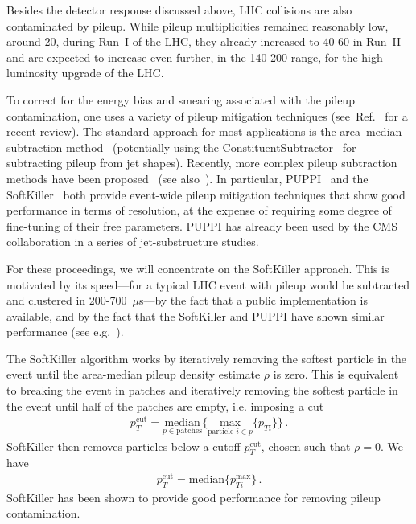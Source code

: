 Besides the detector response discussed above, LHC collisions are also
contaminated by pileup.
%
While pileup multiplicities remained reasonably low, around 20, during Run~I of
the LHC, they already increased to 40-60 in Run~II and are expected to
increase even further, in the 140-200 range, for the high-luminosity
upgrade of the LHC.

To correct for the energy bias and smearing associated with the
pileup contamination, one uses a variety of pileup mitigation
techniques (see~Ref.~\cite{Soyez:2018opl} for a recent review). The
standard approach for most applications is the area--median
subtraction
method~\cite{Cacciari:2007fd,Cacciari:2008gn,AlcarazMaestre:2012vp,Soyez:2012hv}
(potentially using the ConstituentSubtractor~\cite{Berta:2014eza} for
subtracting pileup from jet shapes). Recently, more complex pileup
subtraction methods have been
proposed~\cite{Krohn:2013lba,Bertolini:2014bba,Cacciari:2014gra,Komiske:2017ubm} (see
also~\cite{Tseng:2013dva,Cacciari:2014jta}). In particular,
PUPPI~\cite{Bertolini:2014bba} and the
SoftKiller~\cite{Cacciari:2014gra} both provide event-wide pileup
mitigation techniques that show good performance in terms of
resolution, at the expense of requiring some degree of fine-tuning of
their free parameters.
%
PUPPI has already been used by the CMS collaboration in a series of
jet-substructure studies.

For these proceedings, we will concentrate on the SoftKiller approach.
This is motivated by its speed---for a typical LHC event with pileup
would be subtracted and clustered in 200-700~$\mu$s---by the fact
that a public implementation is available, and by the fact that the
SoftKiller and PUPPI have shown similar performance (see e.g.~\cite{puws14}).


The SoftKiller algorithm works by iteratively removing the softest particle in
the event until the area-median pileup density estimate $\rho$ is
zero. This is equivalent to breaking the event in patches and
iteratively removing the softest particle in the event until half of
the patches are empty, i.e. imposing a cut
%
\begin{align}
p_T^{\text{cut}}=\underset{p \in \text{patches}}{\text{median}}\Big\{
  \underset{\text{particle }i\in p}{\text{max}}\{ p_{Ti}\}\Big\}\,.
\end{align}
SoftKiller then removes particles below a cutoff $p_T^{\text{cut}}$, chosen such that $\rho=0$. We have
\begin{align}
p_T^{\text{cut}}=\text{median} \{ p_{Ti}^{\text{max}} \}\,.
\end{align}
SoftKiller has been shown to provide good performance for removing pileup contamination.

